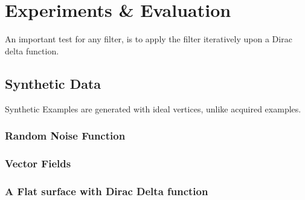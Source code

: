 \chapter{Experiments \& Evaluation}
An important test for any filter\todoCitation {}, is to apply the filter iteratively upon a Dirac delta function\todoCitation.
\section{Synthetic Data}
Synthetic Examples are generated with ideal vertices, unlike acquired examples.

\subsection{Random Noise Function}

\subsection{Vector Fields}

\subsection{A Flat surface with Dirac Delta function}
